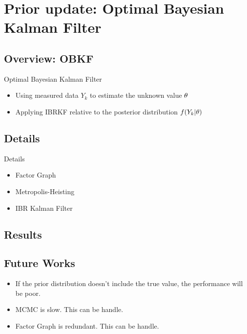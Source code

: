 \section{Prior update: Optimal Bayesian Kalman Filter}

\subsection{Overview: OBKF}
\begin{frame}{Optimal Bayesian Kalman Filter}
\begin{itemize}
    \item Using measured data $Y_k$ to estimate the unknown value ${\bf \theta}$
    \item Applying IBRKF relative to the posterior distribution $f(Y_k|{\bf \theta})$
\end{itemize}
\end{frame}

\subsection{Details}

\begin{frame}{Details}
\begin{itemize}
    \item Factor Graph
    \item Metropolis-Heisting
    \item IBR Kalman Filter
\end{itemize}
\end{frame}

\subsection{Results}

\begin{frame}{}
\end{frame}

\subsection{Future Works}
\begin{frame}{}
\begin{itemize}
    \item If the prior distribution doesn't include the true value, the performance will be poor.
    \item MCMC is slow. This can be handle.
    \item Factor Graph is redundant. This can be handle.
\end{itemize}
\end{frame}